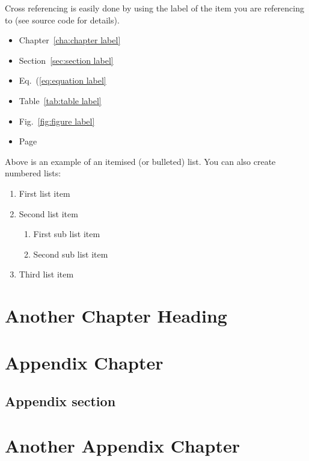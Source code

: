 \documentclass[11pt, a4paper]{report}
\begin{document}
Cross referencing is easily done by using the label of the item you are referencing to (see source code for details).
\begin{itemize}
  \item Chapter~\ref{cha:chapter label}
  \item Section~\ref{sec:section label}
  \item Eq.~(\ref{eq:equation label}
  \item Table~\ref{tab:table label}
  \item Fig.~\ref{fig:figure label}
  \item Page~\pageref{eq:equation label}
\end{itemize}

Above is an example of an itemised (or bulleted) list. You can also create numbered lists:
\begin{enumerate}
  \item First list item
  \item Second list item
  \begin{enumerate}
    \item First sub list item
    \item Second sub list item
  \end{enumerate}
  \item Third list item
\end{enumerate}

\chapter{Another Chapter Heading} %
\label{cha:chapter 2 label} %


\renewcommand\bibname{References}
\printbibliography

\appendix
\chapter{Appendix Chapter}

\section{Appendix section}
\lipsum[4]  %

\chapter{Another Appendix Chapter}
\lipsum[5]  %

\end{document}
